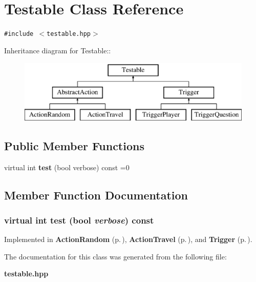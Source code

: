 \section{Testable Class Reference}
\label{classTestable}
{\tt \#include $<$testable.hpp$>$}

Inheritance diagram for Testable::\begin{figure}[H]
\begin{center}
\leavevmode
\includegraphics[height=3cm]{classTestable}
\end{center}
\end{figure}
\subsection*{Public Member Functions}
\begin{CompactItemize}
\item 
virtual int {\bf test} (bool verbose) const =0
\end{CompactItemize}


\subsection{Member Function Documentation}
\subsubsection{\setlength{\rightskip}{0pt plus 5cm}virtual int test (bool {\em verbose}) const\hspace{0.3cm}{\tt  [pure virtual]}}\label{classTestable_a0}




Implemented in {\bf Action\-Random} {\rm (p.\,\pageref{classActionRandom_a4})}, {\bf Action\-Travel} {\rm (p.\,\pageref{classActionTravel_a4})}, and {\bf Trigger} {\rm (p.\,\pageref{classTrigger_a8})}.

The documentation for this class was generated from the following file:\begin{CompactItemize}
\item 
{\bf testable.hpp}\end{CompactItemize}
